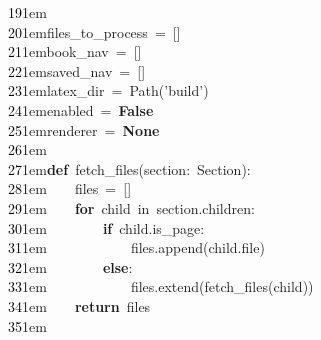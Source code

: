 \documentclass{article}
\newcommand{\codeKeyword}[1]{\textcolor{trac-keyword}{\bfseries #1}}
\newcommand{\codeString}[1]{\textcolor{trac-string}{#1}}
\newcommand{\codeOperator}[1]{\textcolor{trac-operator}{#1}}
\newcommand{\codeText}[1]{\textcolor{trac-text}{#1}}
\newcommand{\linenumber}[1]{\textcolor{black}{#1}\kern 1em}
\begin{document}
{\linenumber{19}\\
\linenumber{20}\codeText{files\_to\_process}\codeText{\ }\codeOperator{=}\codeText{\ }\codeText{[}\codeText{]}\\
\linenumber{21}\codeText{book\_nav}\codeText{\ }\codeOperator{=}\codeText{\ }\codeText{[}\codeText{]}\\
\linenumber{22}\codeText{saved\_nav}\codeText{\ }\codeOperator{=}\codeText{\ }\codeText{[}\codeText{]}\\
\linenumber{23}\codeText{latex\_dir}\codeText{\ }\codeOperator{=}\codeText{\ }\codeText{Path}\codeText{(}\codeString{'}\codeString{build}\codeString{'}\codeText{)}\\
\linenumber{24}\codeText{enabled}\codeText{\ }\codeOperator{=}\codeText{\ }\codeKeyword{False}\\
\linenumber{25}\codeText{renderer}\codeText{\ }\codeOperator{=}\codeText{\ }\codeKeyword{None}\\
\linenumber{26}\\
\linenumber{27}\codeKeyword{def}\codeText{\ }\codeText{fetch\_files}\codeText{(}\codeText{section}\codeText{:}\codeText{\ }\codeText{Section}\codeText{)}\codeText{:}\\
\linenumber{28}\codeText{\ \ \ \ }\codeText{files}\codeText{\ }\codeOperator{=}\codeText{\ }\codeText{[}\codeText{]}\\
\linenumber{29}\codeText{\ \ \ \ }\codeKeyword{for}\codeText{\ }\codeText{child}\codeText{\ }\codeOperator{in}\codeText{\ }\codeText{section}\codeOperator{.}\codeText{children}\codeText{:}\\
\linenumber{30}\codeText{\ \ \ \ \ \ \ \ }\codeKeyword{if}\codeText{\ }\codeText{child}\codeOperator{.}\codeText{is\_page}\codeText{:}\\
\linenumber{31}\codeText{\ \ \ \ \ \ \ \ \ \ \ \ }\codeText{files}\codeOperator{.}\codeText{append}\codeText{(}\codeText{child}\codeOperator{.}\codeText{file}\codeText{)}\\
\linenumber{32}\codeText{\ \ \ \ \ \ \ \ }\codeKeyword{else}\codeText{:}\\
\linenumber{33}\codeText{\ \ \ \ \ \ \ \ \ \ \ \ }\codeText{files}\codeOperator{.}\codeText{extend}\codeText{(}\codeText{fetch\_files}\codeText{(}\codeText{child}\codeText{)}\codeText{)}\\
\linenumber{34}\codeText{\ \ \ \ }\codeKeyword{return}\codeText{\ }\codeText{files}\\
\linenumber{35}
}
\end{document}
